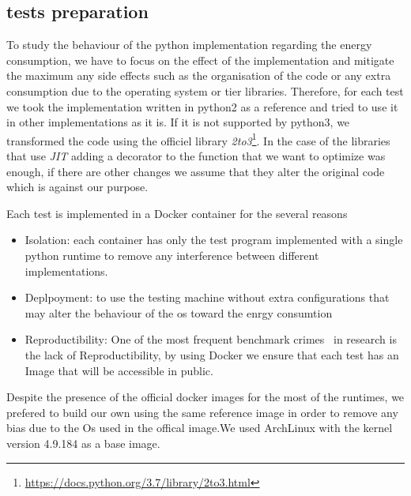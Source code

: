 \subsection{tests preparation}



To study the behaviour of the python implementation regarding the energy consumption, we have to focus on the effect of the implementation and mitigate the maximum any side effects such as the organisation of the code or any extra consumption due to the operating system or tier libraries.
Therefore, for each test we took the implementation written in python2 as a reference and tried to use it in other implementations as it is. If it is not supported by python3, we transformed the code using the officiel library  \emph{2to3}\footnote{\url{https://docs.python.org/3.7/library/2to3.html}}.
In the case of the libraries that use \emph{JIT} adding a decorator to the function that we want to optimize was enough, if there are other changes we assume that they alter the original code which is against our purpose.

Each test is implemented in a Docker container for the several reasons
\begin{itemize}
    \item Isolation: each container has only the test program implemented with a single python runtime to remove any interference between different implementations.
    \item Deplpoyment: to use the testing machine without extra configurations that may alter the behaviour of the os toward the enrgy consumtion
    \item Reproductibility: One of the most frequent benchmark crimes~\cite{DBLP:journals/corr/abs-1801-02381} in research is the lack of Reproductibility, by using Docker we ensure that each test has an Image that will be accessible in public.
\end{itemize}

Despite the presence of the official docker images for the most of the runtimes, we prefered to build our own using the same reference image in order to remove any bias due to the Os used in the offical image.We used ArchLinux with the kernel version 4.9.184 as a base image.


